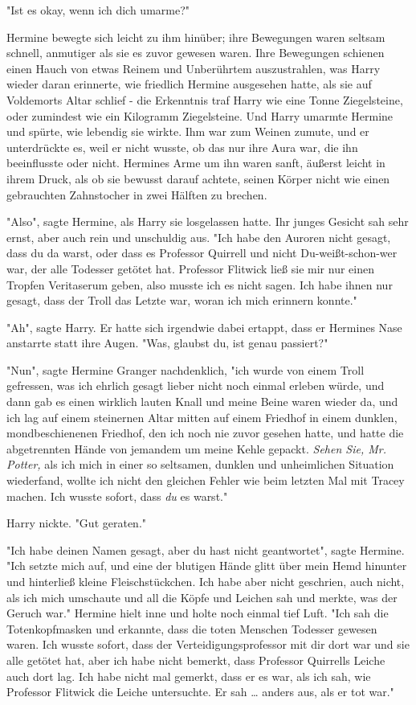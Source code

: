{"Ist es okay, wenn ich dich umarme?"

Hermine bewegte sich leicht zu ihm hinüber; ihre Bewegungen waren seltsam schnell, anmutiger als sie es zuvor gewesen waren. Ihre Bewegungen schienen einen Hauch von etwas Reinem und Unberührtem auszustrahlen, was Harry wieder daran erinnerte, wie friedlich Hermine ausgesehen hatte, als sie auf Voldemorts Altar schlief - die Erkenntnis traf Harry wie eine Tonne Ziegelsteine, oder zumindest wie ein Kilogramm Ziegelsteine. Und Harry umarmte Hermine und spürte, wie lebendig sie wirkte. Ihm war zum Weinen zumute, und er unterdrückte es, weil er nicht wusste, ob das nur ihre Aura war, die ihn beeinflusste oder nicht. Hermines Arme um ihn waren sanft, äußerst leicht in ihrem Druck, als ob sie bewusst darauf achtete, seinen Körper nicht wie einen gebrauchten Zahnstocher in zwei Hälften zu brechen.

"Also", sagte Hermine, als Harry sie losgelassen hatte. Ihr junges Gesicht sah sehr ernst, aber auch rein und unschuldig aus. "Ich habe den Auroren nicht gesagt, dass du da warst, oder dass es Professor Quirrell und nicht Du-weißt-schon-wer war, der alle Todesser getötet hat. Professor Flitwick ließ sie mir nur einen Tropfen Veritaserum geben, also musste ich es nicht sagen. Ich habe ihnen nur gesagt, dass der Troll das Letzte war, woran ich mich erinnern konnte."

"Ah", sagte Harry. Er hatte sich irgendwie dabei ertappt, dass er Hermines Nase anstarrte statt ihre Augen. "Was, glaubst du, ist genau passiert?"

"Nun", sagte Hermine Granger nachdenklich, "ich wurde von einem Troll gefressen, was ich ehrlich gesagt lieber nicht noch einmal erleben würde, und dann gab es einen wirklich lauten Knall und meine Beine waren wieder da, und ich lag auf einem steinernen Altar mitten auf einem Friedhof in einem dunklen, mondbeschienenen Friedhof, den ich noch nie zuvor gesehen hatte, und hatte die abgetrennten Hände von jemandem um meine Kehle gepackt. \emph{Sehen Sie, Mr. Potter,} als ich mich in einer so seltsamen, dunklen und unheimlichen Situation wiederfand, wollte ich nicht den gleichen Fehler wie beim letzten Mal mit Tracey machen. Ich wusste sofort, dass \emph{du} es warst."

Harry nickte. "Gut geraten."

"Ich habe deinen Namen gesagt, aber du hast nicht geantwortet", sagte Hermine. "Ich setzte mich auf, und eine der blutigen Hände glitt über mein Hemd hinunter und hinterließ kleine Fleischstückchen. Ich habe aber nicht geschrien, auch nicht, als ich mich umschaute und all die Köpfe und Leichen sah und merkte, was der Geruch war." Hermine hielt inne und holte noch einmal tief Luft. "Ich sah die Totenkopfmasken und erkannte, dass die toten Menschen Todesser gewesen waren. Ich wusste sofort, dass der Verteidigungsprofessor mit dir dort war und sie alle getötet hat, aber ich habe nicht bemerkt, dass Professor Quirrells Leiche auch dort lag. Ich habe nicht mal gemerkt, dass er es war, als ich sah, wie Professor Flitwick die Leiche untersuchte. Er sah … anders aus, als er tot war."

}
